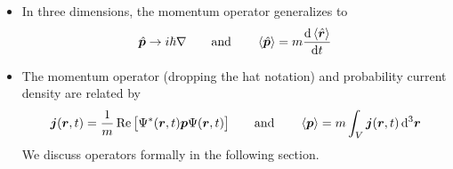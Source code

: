 \documentclass[11pt, a4paper]{article}
\newcommand{\diff}{\mathop{}\!\mathrm{d}} %
\newcommand{\dr}{\diff^{3} \r}  %
\renewcommand{\grad}{\nabla}
\newcommand{\eqtext}[1]{\qquad \text{#1} \qquad}
\renewcommand{\vec}[1]{\bm{#1}}  %
\renewcommand{\r}{\vec{r}}  %
\renewcommand{\P}{\Psi}  %
\begin{document}
\begin{itemize}
	\item In three dimensions, the momentum operator generalizes to 
	\begin{equation*}
		\hat{\vec{p}} \to i \hbar \grad \eqtext{and}  \ev{\hat{\vec{p}}} = m \dv{\ev{\hat{\vec{r}}}}{t}
	\end{equation*}
	
	\item The momentum operator (dropping the hat notation) and probability current density are related by
	\begin{equation*}
		\vec{j}(\r, t) = \frac{1}{m}\Re \big[\P^{*}(\r, t) \vec{p} \P(\r, t)\big] \eqtext{and} \ev{\bm{p}}  = m \int_{V} \vec{j}(\r, t) \dr
	\end{equation*}
	We discuss operators formally in the following section.
\end{itemize}
\end{document}
